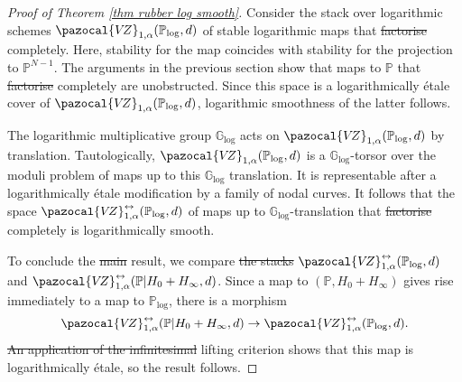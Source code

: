 \documentclass[11pt]{amsart}
\newcommand{\VZ}{\pazocal{V\!Z}}
\renewcommand{\to}{\rightarrow}
\newcommand{\Glog}{\mathbb{G}_{\mathrm{log}}}
\theoremstyle{definition}
\theoremstyle{definition}
\providecommand{\DIFaddtex}[1]{{\protect\color{blue}\uwave{#1}}} %
\providecommand{\DIFdeltex}[1]{{\protect\color{red}\sout{#1}}}                      %
\providecommand{\DIFaddbegin}{} %
\providecommand{\DIFaddend}{} %
\providecommand{\DIFdelbegin}{} %
\providecommand{\DIFdelend}{} %
\providecommand{\DIFadd}[1]{\texorpdfstring{\DIFaddtex{#1}}{#1}} %
\providecommand{\DIFdel}[1]{\texorpdfstring{\DIFdeltex{#1}}{}} %
\begin{document}
\begin{proof}[Proof of Theorem \ref{thm rubber log smooth}]
Consider the stack over logarithmic schemes $\VZ_{1,\alpha}(\mathbb P_{\mathrm{log}},d)$ of stable logarithmic maps that \DIFdelbegin \DIFdel{factorise }\DIFdelend \DIFaddbegin \DIFadd{factor }\DIFaddend completely. Here, stability for the map coincides with stability for the projection to $\mathbb P^{N-1}$. The arguments in the previous section show that maps to $\mathbb P$ that \DIFdelbegin \DIFdel{factorise }\DIFdelend \DIFaddbegin \DIFadd{factor }\DIFaddend completely are unobstructed. Since this space is a logarithmically \'etale cover of $\VZ_{1,\alpha}(\mathbb P_{\mathrm{log}},d)$, logarithmic smoothness of the latter follows.

The logarithmic multiplicative group $\mathbb G_{\mathrm{log}}$ acts on $\VZ_{1,\alpha}(\mathbb P_{\mathrm{log}},d)$ by translation. Tautologically, $\VZ_{1,\alpha}(\mathbb P_{\mathrm{log}},d)$ is a $\mathbb G_{\mathrm{log}}$-torsor over the moduli problem of maps up to this $\mathbb G_{\mathrm{log}}$ translation. It is representable after a logarithmically \'etale modification by a family of nodal curves. It follows that the space $\VZ^{\leftrightarrow}_{1,\alpha}(\mathbb P_{\mathrm{log}},d)$ of maps up to $\Glog$-translation that \DIFdelbegin \DIFdel{factorise }\DIFdelend \DIFaddbegin \DIFadd{factor }\DIFaddend completely is logarithmically smooth. 

To conclude the \DIFdelbegin \DIFdel{main }\DIFdelend result, we compare \DIFdelbegin \DIFdel{the stacks }\DIFdelend $\VZ^{\leftrightarrow}_{1,\alpha}(\mathbb P_{\mathrm{log}},d)$ and  $\VZ^{\leftrightarrow}_{1,\alpha}(\mathbb P|H_0+H_\infty,d)$. Since a map to $(\mathbb P,H_0+H_\infty)$ gives rise immediately to a map to $\mathbb P_{\mathrm{log}}$, there is a morphism
\[
\VZ^{\leftrightarrow}_{1,\alpha}(\mathbb P|H_0+H_\infty,d)\to \VZ^{\leftrightarrow}_{1,\alpha}(\mathbb P_{\mathrm{log}},d).
\]
\DIFdelbegin \DIFdel{An application of the infinitesimal }\DIFdelend \DIFaddbegin \DIFadd{The }\DIFaddend lifting criterion shows that this map is logarithmically \'etale, so the result follows.
\end{proof}
\end{document}
